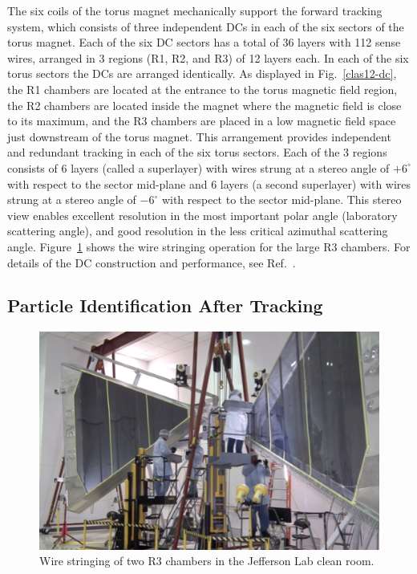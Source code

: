 \documentclass[final,3p,twocolumn]{elsarticle}
\begin{document}
The six coils of the torus magnet mechanically support the forward tracking system, which consists of three
independent DCs in each of the six sectors of the torus magnet. Each of the six DC sectors has a total of 36
layers with 112 sense wires, arranged in 3 regions (R1, R2, and R3) of 12 layers each. In each of the six torus
sectors the DCs are arranged identically. As displayed in Fig.~\ref{clas12-dc}, the R1 chambers are located at
the entrance to the torus magnetic field region, the R2 chambers are located inside the magnet where the
magnetic field is close to its maximum, and the R3 chambers are placed in a low magnetic field space just
downstream of the torus magnet. This arrangement provides independent and redundant tracking in each of the
six torus sectors. Each of the 3 regions consists of 6 layers (called a superlayer) with wires strung at a stereo
angle of $+6^\circ$ with respect to the sector mid-plane and 6 layers (a second superlayer) with wires strung at
a stereo angle of $-6^\circ$ with respect to the sector mid-plane. This stereo view enables excellent resolution in
the most important polar angle (laboratory scattering angle), and good resolution in the less critical azimuthal
scattering angle. Figure~\ref{dc-stringing} shows the wire stringing operation for the large R3 chambers. For
details of the DC construction and performance, see Ref.~\cite{DC}.

\subsection{Particle Identification After Tracking}
\begin{figure}[htbp!]
\centerline{\includegraphics[width=1.65\columnwidth]{DC-R3.png}}
\caption{Wire stringing of two R3 chambers in the Jefferson Lab clean room.}
\label{dc-stringing}
\end{figure}
\end{document}
